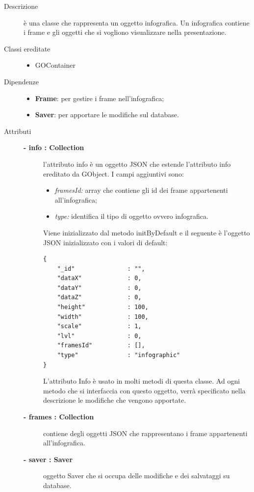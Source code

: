 \begin{description}
\item[Descrizione] \hfill
	è una classe che rappresenta un oggetto infografica. Un infografica contiene i frame e gli oggetti che si vogliono visualizzare nella presentazione.
	
\item[Classi ereditate] \hfill
	\begin{itemize}
		\item GOContainer
	\end{itemize}
	
\item[Dipendenze] \hfill
	\begin{itemize}
		\item \textbf{Frame}: per gestire i frame nell'infografica;
		\item \textbf{Saver}: per apportare le modifiche sul database.
	\end{itemize}	
	
\item[Attributi] \hfill
	\begin{description}
		\item[\textbf{- info : Collection			}] \hfill
			l'attributo info è un oggetto JSON che estende l'attributo info ereditato da GObject. I campi aggiuntivi sono:
	\begin{itemize}
		\item \textit{framesId:} array che contiene gli id dei frame appartenenti all'infografica;
		\item \textit{type:} identifica il tipo di oggetto ovvero infografica.		
	\end{itemize}
	Viene inizializzato dal metodo initByDefault e il seguente è l'oggetto JSON inizializzato con i valori di default:
\begin{lstlisting}
{
    "_id"               : "",    
    "dataX"             : 0,
    "dataY"             : 0,
    "dataZ"             : 0,
    "height"            : 100,
    "width"             : 100,
    "scale"             : 1,
    "lvl"               : 0,
    "framesId"          : [],
    "type"              : "infographic"
}
\end{lstlisting}					
                 L'attributo Info è usato in molti metodi di questa classe. Ad ogni metodo che si interfaccia con questo oggetto, verrà specificato nella descrizione le modifiche che vengono apportate. 
		\item[\textbf{- frames : Collection			}] \hfill
			contiene degli oggetti JSON che rappresentano i frame appartenenti all'infografica.
		\item[\textbf{- saver : Saver			}] \hfill
			oggetto Saver che si occupa delle modifiche e dei salvataggi su database.
	\end{description}	
	

\end{description}
